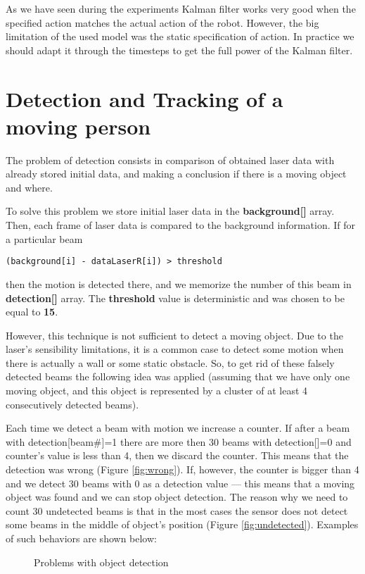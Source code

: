 \documentclass{article}
\begin{document}
As we have seen during the experiments Kalman filter works very good
when the specified action matches the actual action of the robot.
However, the big limitation of the used model was the static
specification of action. In practice we should adapt it through the
timesteps to get the full power of the Kalman filter.

\section{Detection and Tracking of a moving person}

The problem of detection consists in comparison of obtained laser data
with already stored initial data, and making a conclusion if there is a
moving object and where. 

To solve this problem we store initial laser data in the
\textbf{background[]} array. Then, each frame of laser data is compared
to the background information. If for a particular beam 
\begin{lstlisting}
(background[i] - dataLaserR[i]) > threshold
\end{lstlisting}
then the motion is detected there, and we memorize the number of this
beam in \textbf{detection[]} array. The \textbf{threshold} value is
deterministic and was chosen to be equal to \textbf{15}.

However, this technique is not sufficient to detect a moving object. Due
to the laser's sensibility limitations, it is a common case to detect some
motion when there is actually a wall or some static obstacle. So, to get
rid of these falsely detected beams the following idea was
applied (assuming that we have only one moving object, and this object
is represented by a cluster of at least 4 consecutively detected beams).

Each time we detect a beam with motion we increase a counter. If after a
beam with detection[beam\#]=1 there are more then 30 beams with
detection[]=0 and counter's value is less than 4, then we discard the
counter. This means that the detection was wrong (Figure
\ref{fig:wrong}). If, however, the
counter is bigger than 4 and we detect 30 beams with 0 as a detection
value --- this means that a moving object was found and we can stop
object detection. The reason why we need to count 30 undetected beams is
that in the most cases the sensor does not detect some beams in the
middle of object's position (Figure \ref{fig:undetected}). Examples of such behaviors are shown below:

\begin{figure}[H]
		  \centering
		  \hspace{0.1cm}
      \hspace{0.1cm}
		  \caption{Problems with object detection}
		  \label{fig:problems}
\end{figure}
\end{document}
